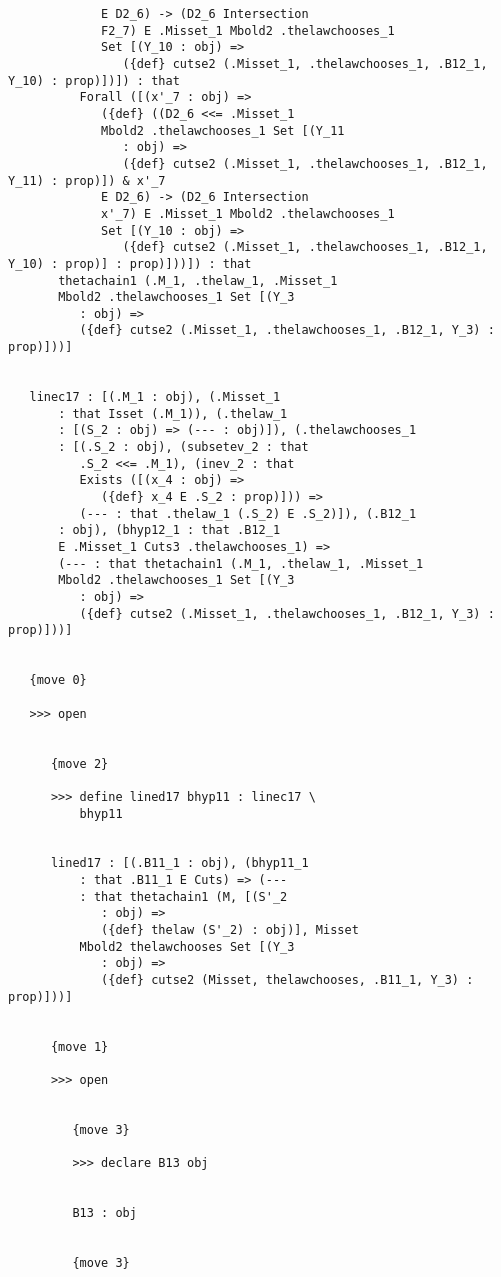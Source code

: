 \documentclass[12pt]{article}
\begin{document}
\begin{verbatim}
             E D2_6) -> (D2_6 Intersection 
             F2_7) E .Misset_1 Mbold2 .thelawchooses_1 
             Set [(Y_10 : obj) => 
                ({def} cutse2 (.Misset_1, .thelawchooses_1, .B12_1, Y_10) : prop)])]) : that 
          Forall ([(x'_7 : obj) => 
             ({def} ((D2_6 <<= .Misset_1 
             Mbold2 .thelawchooses_1 Set [(Y_11 
                : obj) => 
                ({def} cutse2 (.Misset_1, .thelawchooses_1, .B12_1, Y_11) : prop)]) & x'_7 
             E D2_6) -> (D2_6 Intersection 
             x'_7) E .Misset_1 Mbold2 .thelawchooses_1 
             Set [(Y_10 : obj) => 
                ({def} cutse2 (.Misset_1, .thelawchooses_1, .B12_1, Y_10) : prop)] : prop)]))]) : that 
       thetachain1 (.M_1, .thelaw_1, .Misset_1 
       Mbold2 .thelawchooses_1 Set [(Y_3 
          : obj) => 
          ({def} cutse2 (.Misset_1, .thelawchooses_1, .B12_1, Y_3) : prop)]))]


   linec17 : [(.M_1 : obj), (.Misset_1 
       : that Isset (.M_1)), (.thelaw_1 
       : [(S_2 : obj) => (--- : obj)]), (.thelawchooses_1 
       : [(.S_2 : obj), (subsetev_2 : that 
          .S_2 <<= .M_1), (inev_2 : that 
          Exists ([(x_4 : obj) => 
             ({def} x_4 E .S_2 : prop)])) => 
          (--- : that .thelaw_1 (.S_2) E .S_2)]), (.B12_1 
       : obj), (bhyp12_1 : that .B12_1 
       E .Misset_1 Cuts3 .thelawchooses_1) => 
       (--- : that thetachain1 (.M_1, .thelaw_1, .Misset_1 
       Mbold2 .thelawchooses_1 Set [(Y_3 
          : obj) => 
          ({def} cutse2 (.Misset_1, .thelawchooses_1, .B12_1, Y_3) : prop)]))]


   {move 0}

   >>> open


      {move 2}

      >>> define lined17 bhyp11 : linec17 \
          bhyp11


      lined17 : [(.B11_1 : obj), (bhyp11_1 
          : that .B11_1 E Cuts) => (--- 
          : that thetachain1 (M, [(S'_2 
             : obj) => 
             ({def} thelaw (S'_2) : obj)], Misset 
          Mbold2 thelawchooses Set [(Y_3 
             : obj) => 
             ({def} cutse2 (Misset, thelawchooses, .B11_1, Y_3) : prop)]))]


      {move 1}

      >>> open


         {move 3}

         >>> declare B13 obj


         B13 : obj


         {move 3}


\end{verbatim}
\end{document}
